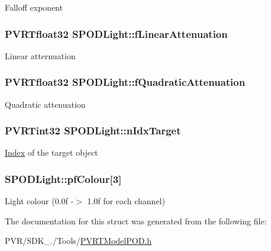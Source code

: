 Falloff exponent \hypertarget{struct_s_p_o_d_light_a6bba814b949bb2070220df71824a59c1}{
\subsubsection[{f\+Linear\+Attenuation}]{\setlength{\rightskip}{0pt plus 5cm}P\+V\+R\+Tfloat32 S\+P\+O\+D\+Light\+::f\+Linear\+Attenuation}}\label{struct_s_p_o_d_light_a6bba814b949bb2070220df71824a59c1}
Linear atternuation \hypertarget{struct_s_p_o_d_light_a184cc38286b6eaf32bf571d818f86d80}{
\subsubsection[{f\+Quadratic\+Attenuation}]{\setlength{\rightskip}{0pt plus 5cm}P\+V\+R\+Tfloat32 S\+P\+O\+D\+Light\+::f\+Quadratic\+Attenuation}}\label{struct_s_p_o_d_light_a184cc38286b6eaf32bf571d818f86d80}
Quadratic attenuation \hypertarget{struct_s_p_o_d_light_a658da875ecd7c7561dd4fa3842214409}{
\subsubsection[{n\+Idx\+Target}]{\setlength{\rightskip}{0pt plus 5cm}P\+V\+R\+Tint32 S\+P\+O\+D\+Light\+::n\+Idx\+Target}}\label{struct_s_p_o_d_light_a658da875ecd7c7561dd4fa3842214409}
\hyperlink{struct_index}{Index} of the target object \hypertarget{struct_s_p_o_d_light_ab95d454ccc73d02d84f1aa69a4dd0d03}{
\subsubsection[{pf\+Colour}]{ S\+P\+O\+D\+Light\+::pf\+Colour\mbox{[}3\mbox{]}}}\label{struct_s_p_o_d_light_ab95d454ccc73d02d84f1aa69a4dd0d03}
Light colour (0.\+0f -\/$>$ 1.\+0f for each channel) 

The documentation for this struct was generated from the following file\+:\begin{DoxyCompactItemize}
\item 
P\+V\+R/\+S\+D\+K\+\_./\+Tools/\hyperlink{_p_v_r_t_model_p_o_d_8h}{P\+V\+R\+T\+Model\+P\+O\+D.\+h}\end{DoxyCompactItemize}
